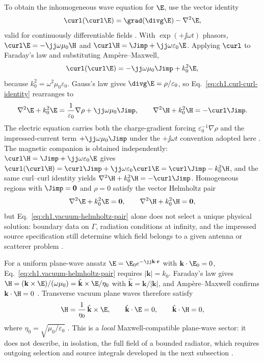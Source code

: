 To obtain the inhomogeneous wave equation for $\E$, use the vector identity
\begin{equation}
\label{eq:ch1.curl-curl-identity}
\curl(\curl\E)=\grad(\divg\E)-\nabla^2\E,
\end{equation}
valid for continuously differentiable fields \cite{stratton1941}. With $\exp(+\jj\omega t)$ phasors, $\curl\E=-\jj\omega\mu_0\H$ and $\curl\H=\Jimp+\jj\omega\varepsilon_0\E$. Applying $\curl$ to Faraday's law and substituting Amp\`ere--Maxwell,
\begin{equation}
\label{eq:ch1.wave-derivation-intermediate}
\curl(\curl\E)=-\jj\omega\mu_0\Jimp+k_0^2\E,
\end{equation}
because $k_0^2=\omega^2\mu_0\varepsilon_0$. Gauss's law gives $\divg\E=\rho/\varepsilon_0$, so Eq.~\eqref{eq:ch1.curl-curl-identity} rearranges to
\begin{equation}
\label{eq:ch1.vacuum-wave-source-driven}
\nabla^2\E+k_0^2\E=\frac{1}{\varepsilon_0}\nabla\rho+\jj\omega\mu_0\Jimp,\qquad
\nabla^2\H+k_0^2\H=-\curl\Jimp.
\end{equation}
The electric equation carries both the charge-gradient forcing $\varepsilon_0^{-1}\nabla\rho$ and the impressed-current term $+\jj\omega\mu_0\Jimp$ under the $+\jj\omega t$ convention adopted here \cite{jackson1999,stratton1941}. The magnetic companion is obtained independently: $\curl\H=\Jimp+\jj\omega\varepsilon_0\E$ gives $\curl(\curl\H)=\curl\Jimp+\jj\omega\varepsilon_0\curl\E=\curl\Jimp-k_0^2\H$, and the same curl--curl identity yields $\nabla^2\H+k_0^2\H=-\curl\Jimp$. Homogeneous regions with $\Jimp=\mathbf{0}$ and $\rho=0$ satisfy the vector Helmholtz pair
\begin{equation}
\label{eq:ch1.vacuum-helmholtz-pair}
\nabla^2\E+k_0^2\E=\mathbf{0},\qquad
\nabla^2\H+k_0^2\H=\mathbf{0},
\end{equation}
but Eq.~\eqref{eq:ch1.vacuum-helmholtz-pair} alone does not select a unique physical solution: boundary data on $\Gamma$, radiation conditions at infinity, and the impressed source specification still determine which field belongs to a given antenna or scatterer problem \cite{stratton1941}.

For a uniform plane-wave ansatz $\E=\E_0 e^{-\jj\mathbf{k}\cdot\mathbf{r}}$ with $\mathbf{k}\cdot\E_0=0$, Eq.~\eqref{eq:ch1.vacuum-helmholtz-pair} requires $|\mathbf{k}|=k_0$. Faraday's law gives $\H=(\mathbf{k}\times\E)/(\omega\mu_0)=\hat{\mathbf{k}}\times\E/\eta_0$ with $\hat{\mathbf{k}}=\mathbf{k}/|\mathbf{k}|$, and Amp\`ere--Maxwell confirms $\mathbf{k}\cdot\H=0$ \cite{stratton1941,jackson1999}. Transverse vacuum plane waves therefore satisfy
\begin{equation}
\label{eq:ch1.local-plane-wave-relations}
\H=\frac{1}{\eta_0}\,\hat{\mathbf{k}}\times\E,\qquad
\hat{\mathbf{k}}\cdot\E=0,\qquad
\hat{\mathbf{k}}\cdot\H=0,
\end{equation}
where $\eta_0=\sqrt{\mu_0/\varepsilon_0}$ \cite{stratton1941,jackson1999}. This is a \emph{local} Maxwell-compatible plane-wave sector: it does not describe, in isolation, the full field of a bounded radiator, which requires outgoing selection and source integrals developed in the next subsection \cite{stratton1941}.

